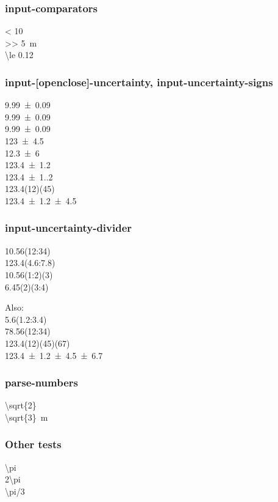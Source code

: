 \documentclass{article}
\begin{document}
\subsubsection{input-comparators}

\num{< 10} \\
\qty{>> 5}{\metre} \\
\num{\le 0.12}

\subsubsection{input-[open\textbar close]-uncertainty, input-uncertainty-signs}
\num{9.99(9)}\\
\num{9.99 +- 0.09}\\
\num{9.99 \pm 0.09}\\
\num{123 +- 4.5}\\
\num{12.3 +- 6}\\
\num{123.4(12)} \\
\num{123.4(1.2)}\\
\num{123.4(12)(45)} \\
\num{123.4 \pm 1.2 \pm 4.5}

\subsubsection{input-uncertainty-divider}
\num{10.56(12:34)} \\
\num{123.4(4.6:7.8)}\\
\num{10.56(1:2)(3)}\\
\num{6.45(2)(3:4)}

Also:\\
\num{5.6(1.2:3.4)} \\
\num{78.56(12:34)} \\
\num{123.4(12)(45)(67)} \\
\num{123.4 \pm 1.2 \pm 4.5 \pm 6.7}


\subsubsection{parse-numbers}
\num[parse-numbers = false]{\sqrt{2}}\\
\qty[parse-numbers = false]{\sqrt{3}}{\metre}

\subsubsection*{Other tests}
\num[parse-numbers=false]{\pi}\\
\num[parse-numbers=false]{2\pi}\\
\num[parse-numbers=false]{\pi/3}
\end{document}
